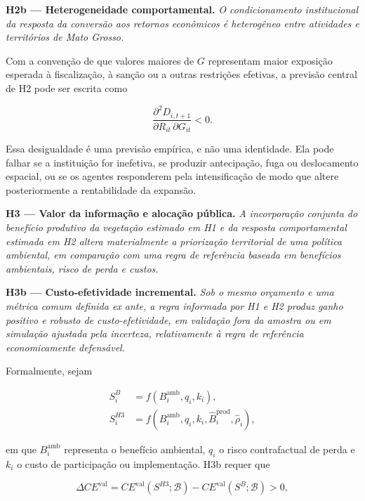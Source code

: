 \medskip
\noindent\textbf{H2b --- Heterogeneidade comportamental.}
\emph{O condicionamento institucional da resposta da conversão aos retornos econômicos é heterogêneo entre atividades e territórios de Mato Grosso.}

Com a convenção de que valores maiores de $G$ representam maior exposição esperada à fiscalização, à sanção ou a outras restrições efetivas, a previsão central de H2 pode ser escrita como

\begin{equation}
    \frac{\partial^2 D_{i,t+1}}
    {\partial R_{it}\,\partial G_{it}} < 0.
    \label{eq:cross_partial_h2}
\end{equation}

Essa desigualdade é uma previsão empírica, e não uma identidade. Ela pode falhar se a instituição for inefetiva, se produzir antecipação, fuga ou deslocamento espacial, ou se os agentes responderem pela intensificação de modo que altere posteriormente a rentabilidade da expansão.

\medskip
\noindent\textbf{H3 --- Valor da informação e alocação pública.}
\emph{A incorporação conjunta do benefício produtivo da vegetação estimado em H1 e da resposta comportamental estimada em H2 altera materialmente a priorização territorial de uma política ambiental, em comparação com uma regra de referência baseada em benefícios ambientais, risco de perda e custos.}

\medskip
\noindent\textbf{H3b --- Custo-efetividade incremental.}
\emph{Sob o mesmo orçamento e uma métrica comum definida ex ante, a regra informada por H1 e H2 produz ganho positivo e robusto de custo-efetividade, em validação fora da amostra ou em simulação ajustada pela incerteza, relativamente à regra de referência economicamente defensável.}

Formalmente, sejam

\begin{align}
    S_i^{B}
    &= f\!\left(B_i^{\mathrm{amb}},q_i,k_i\right),
    \label{eq:baseline_score}\\
    S_i^{H3}
    &= f\!\left(B_i^{\mathrm{amb}},q_i,k_i,
       \widehat{B}_i^{\mathrm{prod}},\widehat{\rho}_i\right),
    \label{eq:expanded_score}
\end{align}

em que $B_i^{\mathrm{amb}}$ representa o benefício ambiental, $q_i$ o risco contrafactual de perda e $k_i$ o custo de participação ou implementação. H3b requer que

\begin{equation}
    \Delta CE^{\mathrm{val}}
    = CE^{\mathrm{val}}\!\left(S^{H3};\mathcal{B}\right)
    - CE^{\mathrm{val}}\!\left(S^{B};\mathcal{B}\right) > 0,
    \label{eq:incremental_ce}
\end{equation}

